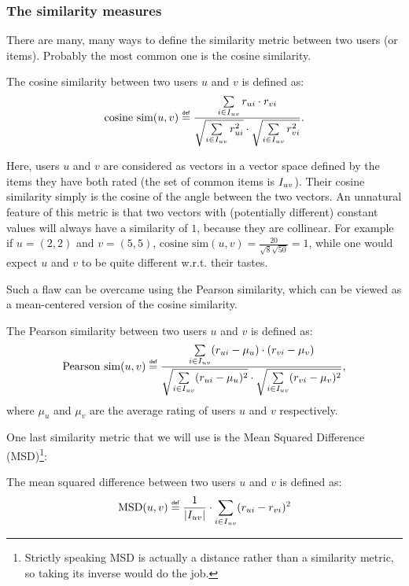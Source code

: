 \subsubsection{The similarity measures}
\label{SEC:similarity_measures}

There are many, many ways to define the similarity metric between two users (or
items).
Probably the most common one is the cosine similarity.

\begin{definition}
  The cosine similarity between two users $u$ and $v$ is defined as:
$$
\text{cosine sim}(u, v) \eqdef \frac{ \sum\limits_{i \in \Iuv} \rui \cdot \rvi}
{\sqrt{\sum\limits_{i \in \Iuv} \rui^2} \cdot \sqrt{\sum\limits_{i \in \Iuv}
\rvi^2}}.
$$
\end{definition}

Here, users $u$ and $v$ are considered as vectors in a vector space defined by
the items they have both rated (the set of common items is $I_{uv}$). Their
cosine similarity simply is the cosine of the angle between the two vectors. An
unnatural feature of this metric is that two vectors with (potentially
different) constant values will always have a similarity of $1$, because they
are collinear. For example if $u = (2, 2)$ and $v = (5, 5)$, $\text{cosine
sim}(u, v) = \frac{20}{\sqrt{8}\sqrt{50}} = 1$, while one would expect $u$ and
$v$ to be quite different w.r.t. their tastes.

Such a flaw can be overcame using the Pearson similarity, which can be viewed as
a mean-centered version of the cosine similarity.

\begin{definition}
  The Pearson similarity between two users $u$ and $v$ is defined as:
$$
\text{Pearson sim}(u, v) \eqdef \frac{ \sum\limits_{i \in \Iuv}
(\rui -  \mu_u) \cdot (\rvi - \mu_{v})} {\sqrt{\sum\limits_{i
\in \Iuv} (\rui -  \mu_u)^2} \cdot \sqrt{\sum\limits_{i \in
\Iuv} (\rvi -  \mu_{v})^2}},
$$
where $\mu_u$ and $\mu_v$ are the average rating of users $u$ and $v$
respectively.
\end{definition}

One last similarity metric that we will use is the Mean Squared Difference
(MSD)\footnote{Strictly speaking MSD is actually a distance rather than a
similarity metric, so taking its inverse would do the job.}:
\begin{definition}
  The mean squared difference between two users $u$ and $v$ is defined as:
$$\text{MSD}(u, v) \eqdef \frac{1}{|\Iuv|} \cdot \sum\limits_{i \in \Iuv} (\rui
- \rvi)^2$$
\end{definition}

